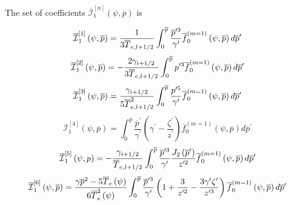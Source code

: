 The set of coefficients $\overline{\mathcal{I}}_{1}^{\left[ n\right] }\left(
\psi ,\overline{p}\right) $ is

\begin{equation}
\overline{\mathcal{I}}_{1}^{\left[ 1\right] }\left( \psi ,\overline{p}%
\right) =\frac{1}{3\overline{T}_{e,l+1/2}}\int_{0}^{\overline{p}}\frac{%
\overline{p}^{\prime 3}}{\gamma ^{\prime }}\overline{f}_{0}^{\left(
m=1\right) }\left( \psi ,\overline{p}\right) d\overline{p}^{\prime }
\end{equation}
\begin{equation}
\overline{\mathcal{I}}_{1}^{\left[ 2\right] }\left( \psi ,\overline{p}
\right) =-\frac{2\gamma _{i+1/2}}{3\overline{T}_{e,l+1/2}}\int_{0}^{%
\overline{p}}p^{\prime 3}\overline{f}_{0}^{\left( m=1\right) }\left( \psi ,%
\overline{p}\right) d\overline{p}^{\prime }
\end{equation}
\begin{equation}
\overline{\mathcal{I}}_{1}^{\left[ 3\right] }\left( \psi ,\overline{p}%
\right) =\frac{\gamma _{i+1/2}}{5\overline{T}_{e,l+1/2}^{2}}\int_{0}^{%
\overline{p}}\frac{p^{\prime 5}}{\gamma ^{\prime }}\overline{f}_{0}^{\left(
m=1\right) }\left( \psi ,\overline{p}\right) d\overline{p}^{\prime }
\end{equation}
\begin{equation}
\overline{\mathcal{I}}_{1}^{\left[ 4\right] }\left( \psi ,\overline{p}
\right) =\int_{0}^{\overline{p}}\frac{\overline{p}^{\prime }}{\gamma
^{\prime }}\left( \gamma ^{\prime }-\frac{\zeta ^{\prime }}{z^{\prime }}%
\right) \overline{f}_{0}^{\left( m=1\right) }\left( \psi ,\overline{p}%
\right) d\overline{p}^{\prime }
\end{equation}
\begin{equation}
\overline{\mathcal{I}}_{1}^{\left[ 5\right] }\left( \psi ,p\right) =-\frac{%
\gamma _{i+1/2}}{\overline{T}_{e,l+1/2}}\int_{0}^{\overline{p}}\frac{%
\overline{p}^{\prime 3}}{\gamma ^{\prime }}\frac{J_{2}\left( \overline{p}%
^{\prime }\right) }{z^{\prime 2}}\overline{f}_{0}^{\left( m=1\right) }\left(
\psi ,\overline{p}\right) d\overline{p}^{\prime }
\end{equation}
\begin{equation}
\overline{\mathcal{I}}_{1}^{\left[ 6\right] }\left( \psi ,\overline{p}%
\right) =\frac{\gamma \overline{p}^{2}-5\overline{T}_{e}\left( \psi \right)
}{6\overline{T}_{e}^{2}\left( \psi \right) }\int_{0}^{\overline{p}}\frac{%
\overline{p}^{\prime 3}}{\gamma ^{\prime }}\left( 1+\frac{3}{z^{\prime 2}}-%
\frac{3\gamma ^{\prime }\zeta ^{\prime }}{z^{\prime 3}}\right) \overline{f}%
_{0}^{\left( m=1\right) }\left( \psi ,\overline{p}\right) d\overline{p}%
^{\prime }
\end{equation}
